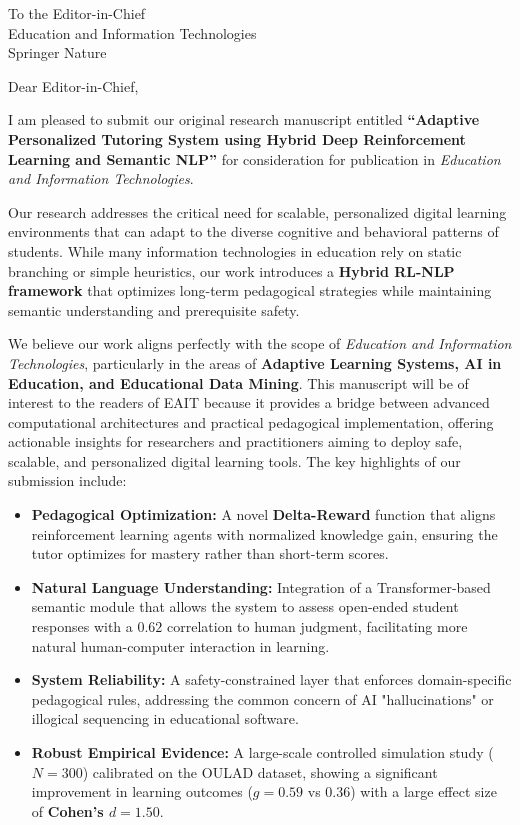 \documentclass[11pt]{letter}
\date{\today}
\begin{document}
\begin{letter}{To the Editor-in-Chief \\
Education and Information Technologies \\
Springer Nature}

\opening{Dear Editor-in-Chief,}

I am pleased to submit our original research manuscript entitled \textbf{``Adaptive Personalized Tutoring System using Hybrid Deep Reinforcement Learning and Semantic NLP''} for consideration for publication in \textit{Education and Information Technologies}.

Our research addresses the critical need for scalable, personalized digital learning environments that can adapt to the diverse cognitive and behavioral patterns of students. While many information technologies in education rely on static branching or simple heuristics, our work introduces a \textbf{Hybrid RL-NLP framework} that optimizes long-term pedagogical strategies while maintaining semantic understanding and prerequisite safety.

We believe our work aligns perfectly with the scope of \textit{Education and Information Technologies}, particularly in the areas of \textbf{Adaptive Learning Systems, AI in Education, and Educational Data Mining}. This manuscript will be of interest to the readers of EAIT because it provides a bridge between advanced computational architectures and practical pedagogical implementation, offering actionable insights for researchers and practitioners aiming to deploy safe, scalable, and personalized digital learning tools. The key highlights of our submission include:

\begin{itemize}[leftmargin=*, noitemsep]
    \item \textbf{Pedagogical Optimization:} A novel \textbf{Delta-Reward} function that aligns reinforcement learning agents with normalized knowledge gain, ensuring the tutor optimizes for mastery rather than short-term scores.
    \item \textbf{Natural Language Understanding:} Integration of a Transformer-based semantic module that allows the system to assess open-ended student responses with a $0.62$ correlation to human judgment, facilitating more natural human-computer interaction in learning.
    \item \textbf{System Reliability:} A safety-constrained layer that enforces domain-specific pedagogical rules, addressing the common concern of AI "hallucinations" or illogical sequencing in educational software.
    \item \textbf{Robust Empirical Evidence:} A large-scale controlled simulation study ($N=300$) calibrated on the OULAD dataset, showing a significant improvement in learning outcomes ($g=0.59$ vs $0.36$) with a large effect size of \textbf{Cohen's $d=1.50$}.
\end{itemize}


\end{letter}
\end{document}
